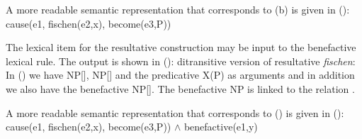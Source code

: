 A more readable semantic representation that corresponds to (b) is given in ():
\ea
cause(e1, fischen(e2,x), become(e3,P))
\z

The lexical item for the resultative construction may be input to the benefactive lexical rule. The
output is shown in ():
\ea 
ditransitive version of resultative \emph{fischen}:
\z
In () we have NP[\str], NP[\str] and the predicative X(P) as arguments and in addition we
also have the benefactive NP[\ldat]. The benefactive NP is linked to the  relation
.

A more readable semantic representation that corresponds to () is given in ():
\ea
cause(e1, fischen(e2,x), become(e3,P)) $\wedge$ benefactive(e1,y)
\z


